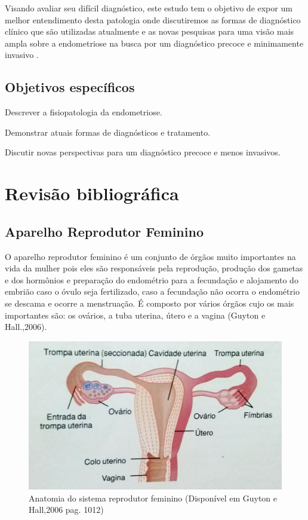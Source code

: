 \documentclass[12pt]{article} %
\begin{document}
Visando avaliar seu difícil diagnóstico, este estudo tem o objetivo de expor um melhor entendimento desta patologia onde discutiremos as formas de diagnóstico clínico que são utilizadas atualmente e as novas pesquisas para uma visão mais ampla sobre a endometriose na busca por um diagnóstico precoce e minimamente invasivo .

\subsection{Objetivos específicos}

Descrever a fisiopatologia da endometriose.

Demonstrar atuais formas de diagnósticos e tratamento.

Discutir novas perspectivas para um diagnóstico precoce e menos invasivos.
\section{Revisão bibliográfica}

\subsection{Aparelho Reprodutor Feminino}
O aparelho reprodutor feminino é um conjunto de órgãos muito importantes na vida da mulher pois eles são responsáveis pela reprodução, produção dos gametas e dos hormônios e preparação do endométrio para a fecundação e alojamento do embrião caso o óvulo seja fertilizado, caso a fecundação não ocorra o endométrio se descama e ocorre a menstruação. É composto por vários órgãos cujo os mais importantes são: os ovários, a tuba uterina, útero e a vagina (Guyton e Hall.,2006).


\begin{figure}[h!]
\includegraphics[width=16cm]{utero.jpg}
\caption[Anatomia do sistema reprodutor feminino]{Anatomia do sistema reprodutor feminino (Disponível em Guyton e Hall,2006 pag. 1012)}
\end{figure}
\end{document}
